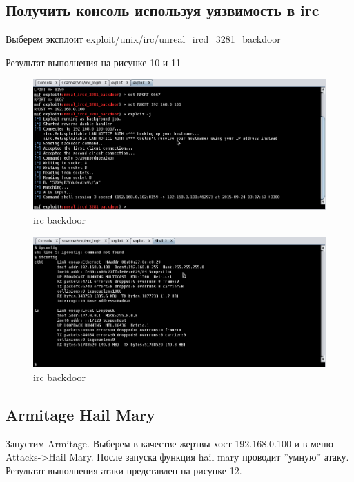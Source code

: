 \documentclass[11pt, a4paper]{article}		%
\begin{document}

\subsection{Получить консоль используя уязвимость в irc}

Выберем эксплоит exploit/unix/irc/unreal\_ircd\_3281\_backdoor

Результат выполнения на рисунке 10 и 11

\begin{figure}[h!]
\centering
\includegraphics[scale=0.8]{res/meta8}
\caption{irc backdoor}
\end{figure}

\begin{figure}[h!]
\centering
\includegraphics[scale=0.8]{res/meta9}
\caption{irc backdoor}
\end{figure}


\subsection{Armitage Hail Mary}

Запустим Armitage. Выберем в качестве жертвы хост 192.168.0.100 и в меню Attacks->Hail Mary. После запуска функция hail mary проводит ”умную” атаку. Результат выполнения атаки представлен на рисунке 12.
\end{document}
